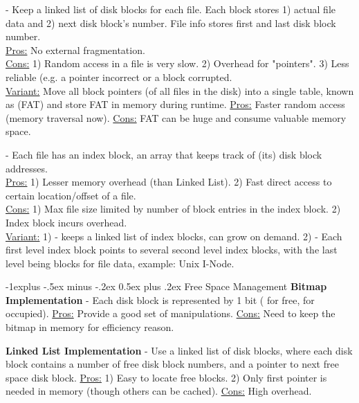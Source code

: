 \documentclass[10pt,landscape,letterpaper]{article}
\makeatletter
\renewcommand{\subsection}{\@startsection{subsection}{2}{0mm}%
                                {-1explus -.5ex minus -.2ex}%
                                {0.5ex plus .2ex}%
                                {\sffamily\normalsize\itshape}}
\makeatother
\begin{document}
\begin{multicols}{3}
\medskip

 - Keep a linked list of disk blocks for each file. Each block stores 1) actual file data and 2) next disk block's number. File info stores first and last disk block number. 
\\
\underline{Pros:} No external fragmentation.
\\
\underline{Cons:} 1) Random access in a file is very slow. 2) Overhead for "pointers". 3) Less reliable (e.g. a pointer incorrect or a block corrupted.
\\
\underline{Variant:} Move all block pointers (of all files in the disk) into a single table, known as  (FAT) and store FAT in memory during runtime. \underline{Pros:} Faster random access (memory traversal now). \underline{Cons:} FAT can be huge and consume valuable memory space.

\medskip

 -  Each file has an index block, an array that keeps track of (its) disk block addresses.
\\
\underline{Pros:} 1) Lesser memory overhead (than Linked List). 2) Fast direct access to certain location/offset of a file.
\\
\underline{Cons:} 1) Max file size limited by number of block entries in the index block. 2) Index block incurs overhead.
\\
\underline{Variant:} 1)  - keeps a linked list of index blocks, can grow on demand. 2)  - Each first level index block points to several second level index blocks, with the last level being blocks for file data, example: Unix I-Node.


\subsection{Free Space Management}
\textbf{Bitmap Implementation} - Each disk block is represented by 1 bit ( for free,  for occupied). \underline{Pros:} Provide a good set of manipulations. \underline{Cons:} Need to keep the bitmap in memory for efficiency reason.

\medskip

\textbf{Linked List Implementation} - Use a linked list of disk blocks, where each disk block contains a number of free disk block numbers, and a pointer to next free space disk block. \underline{Pros:} 1) Easy to locate free blocks. 2) Only first pointer is needed in memory (though others can be cached). \underline{Cons:} High overhead.



\end{multicols}
\end{document}
